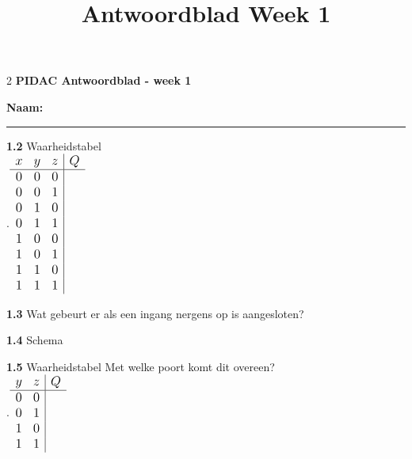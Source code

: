 \documentclass[a4paper,12pt]{paper}
\title{Antwoordblad Week 1}
\date{}
\begin{document}
\begin{multicols}{2}
\textbf{\large PIDAC Antwoordblad - week 1}

\vspace{0.8cm}
\textbf{Naam:} \rule{12cm}{0.4pt}


\begin{tcolorbox}
\textbf{1.2} Waarheidstabel\\
.\hspace{0.6cm}\(
\large
\begin{array}{ccc|c}
x & y & z & Q\\
\hline
0 & 0 & 0 &   \\
0 & 0 & 1 &   \\
0 & 1 & 0 &   \\
0 & 1 & 1 &   \\
1 & 0 & 0 &   \\
1 & 0 & 1 &   \\
1 & 1 & 0 &   \\
1 & 1 & 1 &   \\
\end{array}
\)
\end{tcolorbox}

\begin{tcolorbox}
\textbf{1.3} Wat gebeurt er als een ingang nergens op is aangesloten?

\vspace{3.5cm}
\end{tcolorbox}

\begin{tcolorbox}
\textbf{1.4} Schema

\vspace{4cm}
\end{tcolorbox}

\columnbreak
\begin{tcolorbox}
\textbf{1.5} Waarheidstabel  \hspace{6em}   Met welke poort komt dit overeen?\\
.\hspace{0.6cm}\(
\large
\begin{array}{cc|c}
y & z & Q \\
\hline
0 & 0 &   \\
0 & 1 &   \\
1 & 0 &   \\
1 & 1 &  
\end{array}
\)
\end{tcolorbox}


\end{multicols}
\end{document}
